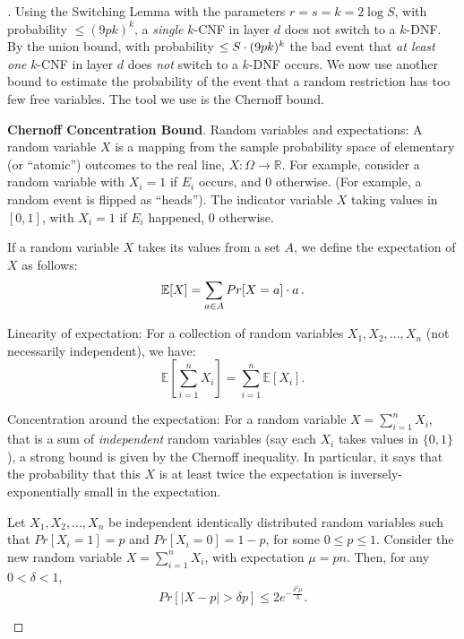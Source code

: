 \begin{proof}[]
Using the Switching Lemma with the parameters \( r = s = k = 2 \log S \), with probability \( \leq (9pk)^k \), a \emph{single} $k$-CNF in layer \( d \) does not switch to a $k$-DNF.
By the union bound, with probability \( \leq S\cdot(9pk)^k \) the bad event that \emph{at least one} $k$-CNF in layer \( d \) does \emph{not} switch to a $k$-DNF occurs.
We now use another bound to estimate the probability of the event that a random restriction has too few free variables. The tool we use is the Chernoff bound.


\begin{tcolorbox}[colframe=white, colback=gray!11, boxrule=0mm, sharp corners]
\textbf{Chernoff Concentration Bound}.
Random variables and expectations: A random variable \( X \) is a mapping from the sample probability space of elementary (or ``atomic'') outcomes to the real line, \( X: \Omega \to \mathbb{R} \). For example, consider a random variable with \( X_i = 1 \) if \( E_i \) occurs, and \( 0 \) otherwise. (For example, a random event is flipped as ``heads''). The indicator variable \( X \) taking values in \( [0, 1] \), with \( X_i = 1 \) if \( E_i \) happened, \( 0 \) otherwise.

If a random variable \( X \) takes its values from a set \( A \), we define the expectation of \( X \) as follows:
\[
\mathbb{E}[X] = \sum_{a\in A} Pr[X = a]\cdot a\,.
\]

Linearity of expectation: For a collection of random variables \( X_1, X_2, ..., X_n \) (not necessarily independent), we have:
\[
\mathbb{E} \left[ \sum_{i=1}^{n} X_i \right] = \sum_{i=1}^{n} \mathbb{E}[X_i].
\]

Concentration around the expectation: 
For a random variable \( X = \sum^n_{i=1} X_i \), that is a sum of \emph{independent} random variables (say each \( X_i \) takes values in \( \{0, 1\} \)), a  strong bound is given by the Chernoff inequality. In particular, it says that the probability that this \( X \) is at least twice the expectation is inversely-exponentially small in the expectation.

\begin{theorem} Let \( X_1, X_2, ..., X_n \) be independent identically distributed random variables such that \( Pr[X_i = 1] = p \) and \( Pr[X_i = 0] = 1 - p \), for some \( 0 \leq p \leq 1 \).
Consider the new random variable \( X = \sum_{i=1}^n X_i \), with expectation \( \mu = pn \). Then, for any \( 0 < \delta < 1 \),
\[
Pr[|X - p| > \delta p] \leq 2 e^{- \frac{\delta^2 \mu}{3}}.
\]
\end{theorem}
\end{tcolorbox}




\end{proof}
